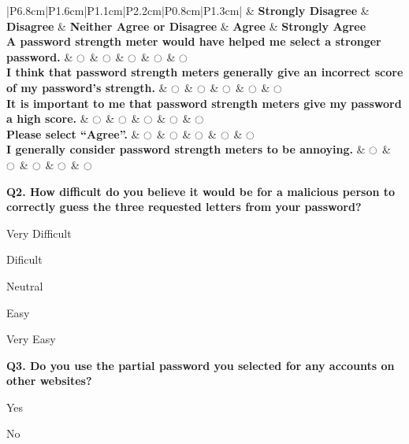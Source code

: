 {      \begin{table}[H]
        \centering
        \scriptsize
        \hspace*{-1cm}
        \begin{tabular}{|P{6.8cm}|P{1.6cm}|P{1.1cm}|P{2.2cm}|P{0.8cm}|P{1.3cm}|}
        \hline
         & \textbf{Strongly Disagree} & \textbf{Disagree} & \textbf{Neither Agree or Disagree} & \textbf{Agree} & \textbf{Strongly Agree} \\
        \hline
        \textbf{A password strength meter would have helped me select a stronger password.} & $\ocircle$ & $\ocircle$ & $\ocircle$ & $\ocircle$ & $\ocircle$ \\
        \hline
          \textbf{I think that password strength meters generally give an incorrect score of my password's strength.} & $\ocircle$ & $\ocircle$ & $\ocircle$ & $\ocircle$ & $\ocircle$ \\
        \hline
          \textbf{It is important to me that password strength meters give my password a high score.} & $\ocircle$ & $\ocircle$ & $\ocircle$ & $\ocircle$ & $\ocircle$ \\
        \hline
          \textbf{Please select ``Agree''.} & $\ocircle$ & $\ocircle$ & $\ocircle$ & $\ocircle$ & $\ocircle$ \\
        \hline
        \textbf{I generally consider password strength meters to be annoying.} & $\ocircle$ & $\ocircle$ & $\ocircle$ & $\ocircle$ & $\ocircle$ \\
        \hline
        \end{tabular}
        \caption{Control group (without strength meter)}
      \end{table}

    \textbf{Q2. How difficult do you believe it would be for a malicious person to correctly guess the three requested letters from your password?}
    \begin{shortitemize}
      \item[$\ocircle$] Very Difficult
      \item[$\ocircle$] Dificult
      \item[$\ocircle$] Neutral
      \item[$\ocircle$] Easy
      \item[$\ocircle$] Very Easy
    \end{shortitemize}

    \textbf{Q3. Do you use the partial password you selected for any accounts on other websites?}
    \begin{shortitemize}
      \item[$\ocircle$] Yes
      \item[$\ocircle$] No
    \end{shortitemize}

}

